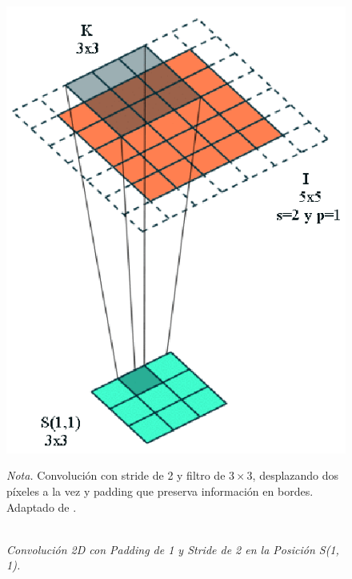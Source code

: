                     \begin{figure}[H] 
                        \caption{\doublespacing \\ \textit{Convolución 2D con Padding de 1 y Stride de 2 en la Posición S(1, 1).}} 
                        \centering
                        \includegraphics[width=0.8\linewidth]{2_CAPITULO0/IMG/stride.png}
                        \begin{justify}
                            \textit{Nota.} Convolución con stride de 2 y filtro de \(3 \times 3\), desplazando dos píxeles a la vez y padding que preserva información en bordes. Adaptado de \textcite{Goodfellow2016}.
                        \end{justify}                    
                        \label{stride}
                    \end{figure}
                    

